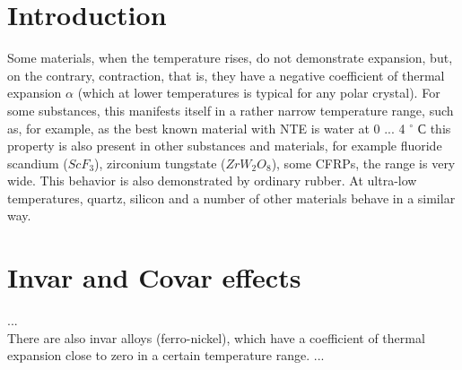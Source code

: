 \documentclass[12pt, a4paper, twocolumn]{article}
\begin{document}
  
    
   
 \clearpage
\section{Introduction}

Some materials, when the temperature rises, do not demonstrate expansion, but, on the contrary, contraction, that is, they have a negative coefficient of thermal expansion $ \alpha $ (which at lower temperatures is typical for any polar crystal). For some substances, this manifests itself in a rather narrow temperature range, such as, for example, as the best known material with NTE is water at 0 ... 4 $^{\circ} $ С this property is also present in other substances and materials, for example fluoride scandium ($ ScF_3 $), zirconium tungstate ($ZrW_2O_8$), some CFRPs, the range is very wide. This behavior is also demonstrated by ordinary rubber. At ultra-low temperatures, quartz, silicon and a number of other materials behave in a similar way.

\section{Invar and Covar effects}

...\\
There are also invar alloys (ferro-nickel), which have a coefficient of thermal expansion close to zero in a certain temperature range.
...\\
\end{document}
